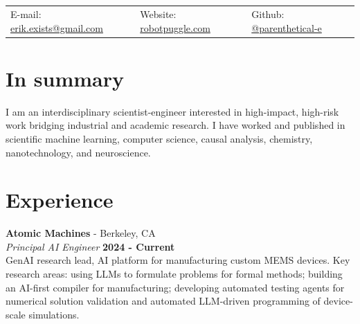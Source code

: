 \documentclass[margin,line]{res}
\begin{document}
\newcommand{\link}[1]{\texttt{#1}}
\providecommand{\tightlist}{%
    \setlength{\itemsep}{0pt}\setlength{\parskip}{0pt}}


\begin{resume}
\section{\sc }
\vspace{.05in}

\begin{tabular}{@{}p{2in}p{2in}p{2in}}
{E-mail:}  {\href{mailto:erik.exists@gmail.com}{erik.exists@gmail.com}} & {Website:} \href{http://robotpuggle.com}{robotpuggle.com} & {Github:} \href{https://github.com/parenthetical-e/}{@parenthetical-e} \\
\end{tabular}

\vspace{-.4cm}
\section{\sc In summary}
I am an interdisciplinary scientist-engineer interested in high-impact, high-risk work bridging industrial and academic research. I have worked and published in scientific machine learning, computer science, causal analysis, chemistry, nanotechnology, and neuroscience.

\vspace{-.25cm}
\section{\sc Experience}
{\bf Atomic Machines} - Berkeley, CA\\
{\em Principal AI Engineer} \hfill {\bf 2024 - Current}\\
GenAI research lead, AI platform for manufacturing custom MEMS devices. Key research areas: using LLMs to formulate problems for formal methods; building an AI-first compiler for manufacturing; developing automated testing agents for numerical solution validation and automated LLM-driven programming of device-scale simulations.


\end{resume}
\end{document}
